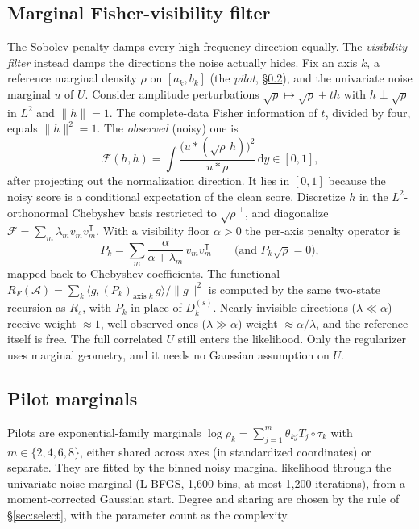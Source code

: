\documentclass[11pt]{article}
\theoremstyle{definition}
\theoremstyle{remark}
\newcommand{\dd}{\,\mathrm{d}}
\newcommand{\T}{\mathsf{T}}
\newcommand{\ip}[2]{\langle #1,#2\rangle}
\newcommand{\norm}[1]{\lVert #1\rVert}
\begin{document}
\subsection{Marginal Fisher-visibility filter}
\label{sec:fisher}
The Sobolev penalty damps every high-frequency direction equally. The \emph{visibility filter} instead damps
the directions the noise actually hides. Fix an axis $k$, a reference marginal density $\rho$ on $[a_k,b_k]$
(the \emph{pilot}, \S\ref{sec:pilot}), and the univariate noise marginal $u$ of $U$. Consider amplitude
perturbations $\sqrt\rho\mapsto\sqrt\rho+th$ with $h\perp\sqrt\rho$ in $L^2$ and $\norm h=1$. The complete-data
Fisher information of $t$, divided by four, equals $\norm h^2=1$. The \emph{observed} (noisy) one is
\begin{equation}\label{eq:fisher}
  \mathcal F(h,h)=\int\frac{\bigl(u*(\sqrt\rho\,h)\bigr)^2}{u*\rho}\dd y\in[0,1],
\end{equation}
after projecting out the normalization direction. It lies in $[0,1]$ because the noisy score is a conditional
expectation of the clean score. Discretize $h$ in the $L^2$-orthonormal Chebyshev basis restricted to
$\sqrt\rho^{\perp}$, and diagonalize $\mathcal F=\sum_m\lambda_mv_mv_m^\T$. With a visibility floor $\alpha>0$ the
per-axis penalty operator is
\begin{equation}\label{eq:filter}
  P_k=\sum_m\frac{\alpha}{\alpha+\lambda_m}\,v_mv_m^\T\qquad\text{(and }P_k\sqrt\rho=0\text{)},
\end{equation}
mapped back to Chebyshev coefficients. The functional $R_F(\mathcal A)=\sum_k\ip{g}{(P_k)_{\text{axis }k}\,g}/\norm g^2$
is computed by the same two-state recursion as $R_s$, with $P_k$ in place of $D_k^{(s)}$. Nearly invisible directions
($\lambda\ll\alpha$) receive weight $\approx 1$, well-observed ones ($\lambda\gg\alpha$) weight $\approx\alpha/\lambda$, and
the reference itself is free. The full correlated $U$ still enters the likelihood. Only the regularizer uses
marginal geometry, and it needs no Gaussian assumption on $U$.

\subsection{Pilot marginals}
\label{sec:pilot}
Pilots are exponential-family marginals $\log\rho_k=\sum_{j=1}^{m}\theta_{kj}T_j\circ\tau_k$ with $m\in\{2,4,6,8\}$,
either shared across axes (in standardized coordinates) or separate. They are fitted by the binned noisy
marginal likelihood through the univariate noise marginal (L-BFGS, 1{,}600 bins, at most 1{,}200 iterations),
from a moment-corrected Gaussian start. Degree and sharing are chosen by the rule of \S\ref{sec:select}, with the
parameter count as the complexity.
\end{document}
